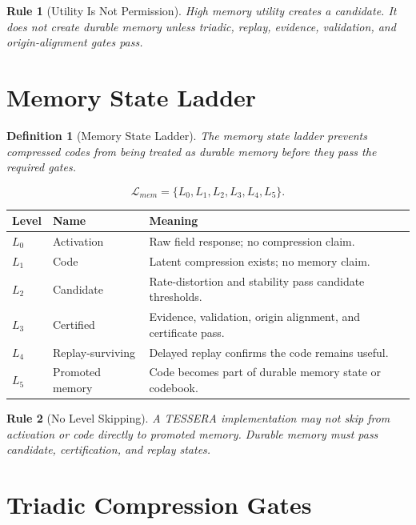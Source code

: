 \documentclass[12pt]{article}
\newtheorem{definition}{Definition}
\newtheorem{rulebox}{Rule}
\begin{document}
\begin{rulebox}[Utility Is Not Permission]
High memory utility creates a candidate. It does not create durable memory
unless triadic, replay, evidence, validation, and origin-alignment gates pass.
\end{rulebox}

\section{Memory State Ladder}

\begin{definition}[Memory State Ladder]
The memory state ladder prevents compressed codes from being treated as durable
memory before they pass the required gates.
\end{definition}

\[
\mathcal{L}_{mem}=\{L_0,L_1,L_2,L_3,L_4,L_5\}.
\]

\begin{longtable}{p{}p{}p{}}
\toprule
\textbf{Level} & \textbf{Name} & \textbf{Meaning} \\
\midrule
$L_0$ & Activation & Raw field response; no compression claim. \\
$L_1$ & Code & Latent compression exists; no memory claim. \\
$L_2$ & Candidate & Rate-distortion and stability pass candidate thresholds. \\
$L_3$ & Certified & Evidence, validation, origin alignment, and certificate pass. \\
$L_4$ & Replay-surviving & Delayed replay confirms the code remains useful. \\
$L_5$ & Promoted memory & Code becomes part of durable memory state or codebook. \\
\bottomrule
\end{longtable}

\begin{rulebox}[No Level Skipping]
A TESSERA implementation may not skip from activation or code directly to
promoted memory. Durable memory must pass candidate, certification, and replay
states.
\end{rulebox}

\section{Triadic Compression Gates}
\end{document}
